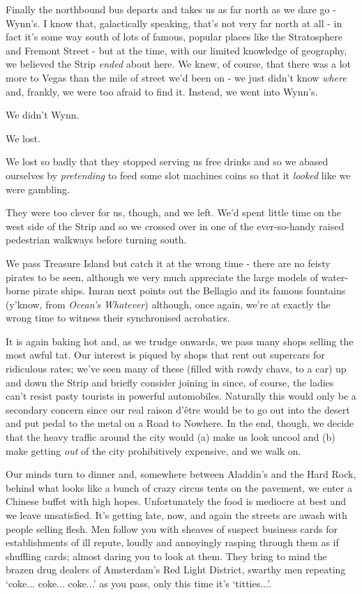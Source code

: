 \documentclass[a5paper,titlepage,11pt]{book}
\begin{document}
Finally the northbound bus departs and takes us as far north as we dare go - Wynn's.  I know that, galactically speaking, that's not very far north at all - in fact it's some way south of lots of famous, popular places like the Stratosphere and Fremont Street - but at the time, with our limited knowledge of geography, we believed the Strip \emph{ended} about here.  We knew, of course, that there was a lot more to Vegas than the mile of street we'd been on - we just didn't know \emph{where} and, frankly, we were too afraid to find it.  Instead, we went into Wynn's.

We didn't Wynn.

We lost.

We lost so badly that they stopped serving us free drinks and so we abased ourselves by \emph{pretending} to feed some slot machines coins so that it \emph{looked} like we were gambling.

They were too clever for us, though, and we left.  We'd spent little time on the west side of the Strip and so we crossed over in one of the ever-so-handy raised pedestrian walkways before turning south.

We pass Treasure Island but catch it at the wrong time - there are no feisty pirates to be seen, although we very much appreciate the large models of water-borne pirate ships.  Imran next points out the Bellagio and its famous fountains (y'know, from \emph{Ocean's Whatever}) although, once again, we're at exactly the wrong time to witness their synchronised acrobatics.

It is again baking hot and, as we trudge onwards, we pass many shops selling the most awful tat.  Our interest is piqued by shops that rent out supercars for ridiculous rates; we've seen many of these (filled with rowdy chavs, to a car) up and down the Strip and briefly consider joining in since, of course, the ladies can't resist pasty tourists in powerful automobiles.  Naturally this would only be a secondary concern since our real raison d'\^{e}tre would be to go out into the desert and put pedal to the metal on a Road to Nowhere.  In the end, though, we decide that the heavy traffic around the city would (a) make us look uncool and (b) make getting \emph{out} of the city prohibitively expensive, and we walk on.

Our minds turn to dinner and, somewhere between Aladdin's and the Hard Rock, behind what looks like a bunch of crazy circus tents on the pavement, we enter a Chinese buffet with high hopes.  Unfortunately the food is mediocre at best and we leave unsatisfied.  It's getting late, now, and again the streets are awash with people selling flesh.  Men follow you with sheaves of suspect business cards for establishments of ill repute, loudly and annoyingly rasping through them as if shuffling cards; almost daring you to look at them.  They bring to mind the brazen drug dealers of Amsterdam's Red Light District, swarthy men repeating `coke... coke... coke...' as you pass, only this time it's `titties...'.
\end{document}
